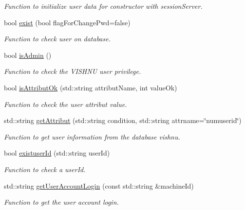 \begin{DoxyCompactItemize}
\begin{DoxyCompactList}\small\item\em Function to initialize user data for constructor with sessionServer. \item\end{DoxyCompactList}\item 
bool \hyperlink{classUserServer_a26ccae7a3b8ee7e62e2224312119aece}{exist} (bool flagForChangePwd=false)
\begin{DoxyCompactList}\small\item\em Function to check user on database. \item\end{DoxyCompactList}\item 
bool \hyperlink{classUserServer_a7dab9117c2ca5a706bb674e43b183255}{isAdmin} ()
\begin{DoxyCompactList}\small\item\em Function to check the VISHNU user privilege. \item\end{DoxyCompactList}\item 
bool \hyperlink{classUserServer_aecc5dd38cacf2460a187f6e751000c9a}{isAttributOk} (std::string attributName, int valueOk)
\begin{DoxyCompactList}\small\item\em Function to check the user attribut value. \item\end{DoxyCompactList}\item 
std::string \hyperlink{classUserServer_aaabcde0c694987b990a3ba1af445f718}{getAttribut} (std::string condition, std::string attrname=\char`\"{}numuserid\char`\"{})
\begin{DoxyCompactList}\small\item\em Function to get user information from the database vishnu. \item\end{DoxyCompactList}\item 
bool \hyperlink{classUserServer_ac61e9715aa922ad746ecd8f788130834}{existuserId} (std::string userId)
\begin{DoxyCompactList}\small\item\em Function to check a userId. \item\end{DoxyCompactList}\item 
std::string \hyperlink{classUserServer_a9ad90b441d2caa41be086f046bc58d62}{getUserAccountLogin} (const std::string \&machineId)
\begin{DoxyCompactList}\small\item\em Function to get the user account login. \item\end{DoxyCompactList}\end{DoxyCompactItemize}
